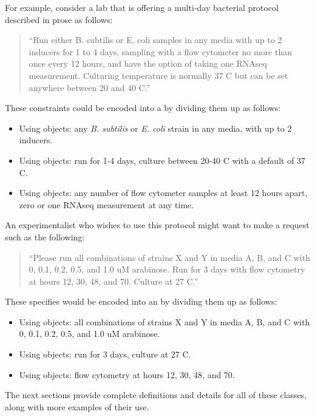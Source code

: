 For example, consider a lab that is offering a multi-day bacterial protocol described in prose as follows:
\begin{quote}
``Run either B. subtilis or E. coli samples in any media with up to 2 inducers for 1 to 4 days, sampling with a flow cytometer no more than once every 12 hours, and have the option of taking one RNAseq measurement. Culturing temperature is normally 37 C but can be set anywhere between 20 and 40 C.''
\end{quote}
These constraints could be encoded into a  by dividing them up as follows:
\begin{itemize}
\item Using  objects: any {\it B. subtilis} or {\it E. coli} strain in any media, with up to 2 inducers.
\item Using  objects: run for 1-4 days, culture between 20-40 C with a default of 37 C.
\item Using  objects: any number of flow cytometer samples at least 12 hours apart, zero or one RNAseq measurement at any time.
\end{itemize}

An experimentalist who wishes to use this protocol might want to make a request such as the following:
\begin{quote}
``Please run all combinations of strains X and Y in media A, B, and C with 0, 0.1, 0.2, 0.5, and 1.0 uM arabinose. Run for 3 days with flow cytometry at hours 12, 30, 48, and 70. Culture at 27 C.''
\end{quote}
These specifies would be encoded into an  by dividing them up as follows:
\begin{itemize}
\item Using  objects: all combinations of strains X and Y in media A, B, and C with 0, 0.1, 0.2, 0.5, and 1.0 uM arabinose.
\item Using  objects: run for 3 days, culture at 27 C.
\item Using  objects: flow cytometry at hours 12, 30, 48, and 70.
\end{itemize}

The next sections provide complete definitions and details for all of these classes, along with more examples of their use.

